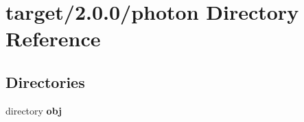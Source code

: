 \section{target/2.0.0/photon Directory Reference}
\label{dir_166798c56c53ea663cd81420d405490d}
\subsection*{Directories}
\begin{DoxyCompactItemize}
\item 
directory \textbf{ obj}
\end{DoxyCompactItemize}

